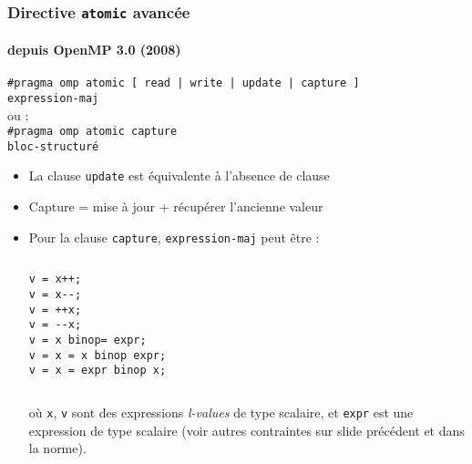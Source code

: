 \documentclass{beamer}
\begin{document}
\begin{frame}
  \frametitle{Directive {\tt atomic} avancée}
  \framesubtitle{depuis OpenMP 3.0 (2008)} 
  
  {\scriptsize 
    \begin{framed}
      {\tt \#pragma omp atomic [ read | write | update | \alert{capture} ]\\ 
          expression-maj}\\
      ou :\\
      {\tt \#pragma omp atomic capture\\ 
        bloc-structuré}
    \end{framed}
  }


\begin{itemize}
  \item La clause {\tt update} est équivalente à l'absence de clause

  \item Capture = mise à jour + récupérer l'ancienne valeur
    
  \item Pour la clause {\tt capture}, {\tt expression-maj} peut être : 

\begin{center}
  \begin{columns}[t]
    \lstinline{v = x++;}\\
    \lstinline{v = x--;}\\
    \lstinline{v = ++x;}\\
    \lstinline{v = --x;}\\

    \lstinline{v = x binop= expr;}\\
    \lstinline{v = x = x binop expr;}\\
    \lstinline{v = x = expr binop x;}\\
  \end{columns}
\end{center}

    où \lstinline{x}, \lstinline{v} sont des expressions {\it
      l-values} de type scalaire, et \lstinline{expr} est une
    expression de type scalaire (voir autres contraintes sur slide
    précédent et dans la norme).

\end{itemize}    
\end{frame}
\end{document}
